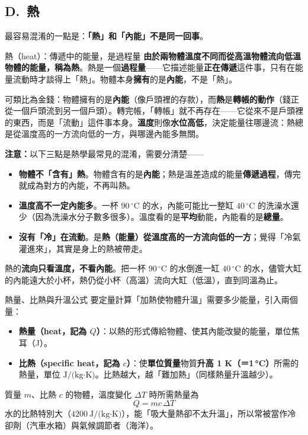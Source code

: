 \documentclass[11pt]{article}
\begin{document}
\subsection*{\sffamily D.\ 熱}

最容易混淆的一點是：\textbf{「熱」和「內能」不是同一回事}。

\begin{補充框}{熱（heat）：傳遞中的能量，是過程量}
\textbf{由於兩物體溫度不同而從高溫物體流向低溫物體的能量，稱為熱}。熱是一個\textbf{過程量}——它描述能量\textbf{正在傳遞}這件事，只有在能量流動時才談得上「熱」。物體本身\textbf{擁有}的是\textbf{內能}，不是「熱」。

可類比為金錢：物體擁有的是\textbf{內能}（像戶頭裡的存款），而\textbf{熱}是\textbf{轉帳的動作}（錢正從一個戶頭流到另一個戶頭）。轉完帳，「轉帳」就不再存在——它從來不是戶頭裡的東西，而是「流動」這件事本身。\textbf{溫度}則像\textbf{水位高低}，決定能量往哪邊流：熱總是從溫度高的一方流向低的一方，與哪邊內能多無關。
\end{補充框}

\textbf{注意：}以下三點是熱學最常見的混淆，需要分清楚——

\begin{itemize}\setlength{\itemsep}{1pt}
\item \textbf{物體不「含有」熱}。物體含有的是\textbf{內能}；熱是溫差造成的能量\textbf{傳遞過程}，傳完就成為對方的內能，不再叫熱。
\item \textbf{溫度高不一定內能多}。一杯 $90\,^\circ$C 的水，內能可能比一整缸 $40\,^\circ$C 的洗澡水還少（因為洗澡水分子數多很多）。溫度看的是\textbf{平均}動能，內能看的是\textbf{總量}。
\item \textbf{沒有「冷」在流動}。是\textbf{熱（能量）從溫度高的一方流向低的一方}；覺得「冷氣灌進來」，其實是身上的熱被帶走。
\end{itemize}

熱的\textbf{流向只看溫度，不看內能}。把一杯 $90\,^\circ$C 的水倒進一缸 $40\,^\circ$C 的水，儘管大缸的內能遠大於小杯，熱仍從小杯（高溫）流向大缸（低溫），直到同溫為止。

\begin{補充框}{熱量、比熱與升溫公式}
要定量計算「加熱使物體升溫」需要多少能量，引入兩個量：
\begin{itemize}\setlength{\itemsep}{2pt}
\item \textbf{熱量（heat，記為 $Q$）}：以熱的形式傳給物體、使其內能改變的能量，單位焦耳（J）。
\item \textbf{比熱（specific heat，記為 $c$）}：使\textbf{單位質量}物質\textbf{升高 1 K（＝1\,°C）}所需的熱量，單位 $\text{J/(kg·K)}$。比熱越大，越「難加熱」（同樣熱量升溫越少）。
\end{itemize}
質量 $m$、比熱 $c$ 的物體，溫度變化 $\Delta T$ 時所需熱量為
$$\boxed{\;Q=mc\,\Delta T\;}$$
水的比熱特別大（$4200\ \text{J/(kg·K)}$），能「吸大量熱卻不太升溫」，所以常被當作冷卻劑（汽車水箱）與氣候調節者（海洋）。
\end{補充框}
\end{document}
